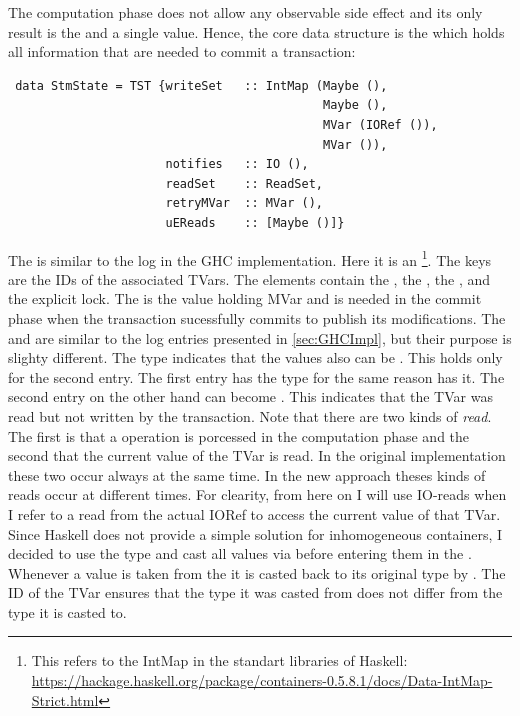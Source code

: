 The computation phase does not allow any observable side effect and its only result is the  and 
a single value.
Hence, the core data structure is the  which holds all information that are needed to commit a transaction:
\begin{lstlisting}
 data StmState = TST {writeSet   :: IntMap (Maybe (),
                                            Maybe (),
                                            MVar (IORef ()),
                                            MVar ()),
                      notifies   :: IO (),
                      readSet    :: ReadSet,
                      retryMVar  :: MVar (),
                      uEReads    :: [Maybe ()]}
\end{lstlisting}
The  is similar to the log in the GHC implementation. Here it is an  
\footnote{This refers to the IntMap in the standart libraries of Haskell: \url{https://hackage.haskell.org/package/containers-0.5.8.1/docs/Data-IntMap-Strict.html}}. 
The keys are the IDs of the associated TVars. The elements contain the ,
the , the , and the explicit lock. The  is the value holding 
MVar and is needed in the commit
phase when the transaction sucessfully commits to publish its modifications. The  
and  are similar to the log entries presented in \ref{sec:GHCImpl}, but their purpose is slighty 
different. The  type indicates that the values also can be . This holds
only for the second entry. The first entry has the  type for the same reason 
 has it. The second entry on the other hand can become . This indicates
that the TVar was read but not written by the transaction. Note that there are two kinds of 
\textit{read}. The first is that a  operation is porcessed in the computation phase
and the second that the current value of the TVar is read. In the original implementation these 
two occur always at the same time. In the new approach theses kinds of reads occur at different times.
For clearity, from here on I will use IO-reads when I refer to a read from the actual IORef to access
the current value of that TVar. Since Haskell does not provide a simple solution for inhomogeneous
containers, I decided to use the type \code{()} and cast all values via  before
entering them in the . Whenever a value is taken from the  it
is casted back to its original type by . The ID of the TVar ensures that 
the type it was casted from does not differ from the type it is casted to.

